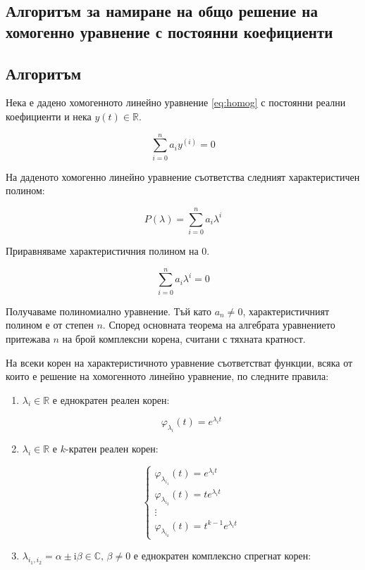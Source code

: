 \documentclass{scrartcl}
\begin{document}
\begin{FlushLeft}
\section{Алгоритъм за намиране на общо решение на хомогенно уравнение с постоянни коефициенти}

\subsection{Алгоритъм}

Нека е дадено хомогенното линейно уравнение \eqref{eq:homog} с постоянни реални коефициенти и нека $y(t) \in \mathbb{R}$.

$$\sum_{i=0}^n a_i y^{(i)} = 0$$

На даденото хомогенно линейно уравнение съответства следният характеристичен полином:

$$P(\lambda) = \sum_{i=0}^n a_i \lambda^i$$

Приравняваме характеристичния полином на $0$.

$$\sum_{i=0}^n a_i \lambda^{i} = 0$$

Получаваме полиномиално уравнение. Тъй като $a_n \ne 0$, характеристичният полином е от степен $n$. Според основната теорема на алгебрата уравнението притежава $n$ на брой комплексни корена, считани с тяхната кратност.

На всеки корен на характеристичното уравнение съответстват функции, всяка от които е решение на хомогенното линейно уравнение, по следните правила:

\begin{enumerate}
    \item $\lambda_i \in \mathbb{R}$ е еднократен реален корен:
    
    $$\varphi_{\lambda_i}(t) = e^{\lambda_i t}$$
    
    \item $\lambda_{i} \in \mathbb{R}$ е $k$-кратен реален корен:

    $$
    \begin{cases}
        \varphi_{\lambda_{i_1}}(t) = e^{\lambda_i t}\\
        \varphi_{\lambda_{i_2}}(t) = te^{\lambda_i t}\\
        \vdots\\
        \varphi_{\lambda_{i_k}}(t) = t^{k-1}e^{\lambda_i t}
    \end{cases}
    $$
    
    \item $\lambda_{i_1, i_2} = \alpha \pm \mathrm{i} \beta\in \mathbb{C}, \, \beta \ne 0$ е еднократен комплексно спрегнат корен:


\end{enumerate}
\end{FlushLeft}
\end{document}
